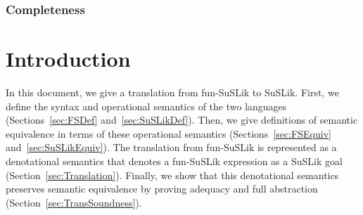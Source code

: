\documentclass[10pt]{article}
\begin{document}
\subsubsection{Completeness}


\section{Introduction}

In this document, we give a translation from fun-SuSLik to SuSLik. First, we define the syntax and
operational semantics of the two languages (Sections~\ref{sec:FSDef} and~\ref{sec:SuSLikDef}).
Then, we give definitions of semantic equivalence in terms of these
operational semantics (Sections~\ref{sec:FSEquiv} and~\ref{sec:SuSLikEquiv}). The translation from fun-SuSLik is represented as a denotational semantics
that denotes a fun-SuSLik expression as a SuSLik goal (Section~\ref{sec:Translation}). Finally, we show that this denotational
semantics preserves semantic equivalence by proving adequacy and full abstraction (Section~\ref{sec:TransSoundness}).
\\
\end{document}
